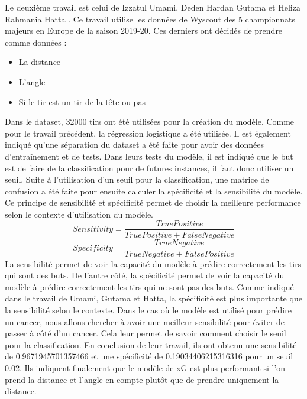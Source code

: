 \documentclass[12pt]{article}
\begin{document}
\noindent Le deuxième travail est celui de Izzatul Umami, Deden Hardan Gutama et Heliza Rahmania Hatta \cite{umamiImplementingExpectedGoal2021}. 
Ce travail utilise les données de Wyscout des 5 championnats majeurs en Europe de la saison 2019-20. Ces derniers ont décidés de prendre comme données :
\begin{itemize}
    \item La distance
    \item L'angle
    \item Si le tir est un tir de la tête ou pas
\end{itemize}
Dans le dataset, 32000 tirs ont été utilisées pour la création du modèle.
Comme pour le travail précédent, la régression logistique a été utilisée.
Il est également indiqué qu'une séparation du dataset a été faite pour avoir des données d'entraînement et de tests.
Dans leurs tests du modèle, il est indiqué que le but est de faire de la classification pour de futures instances, il faut donc utiliser un seuil.
Suite à l'utilisation d'un seuil pour la classification, une matrice de confusion a été faite pour ensuite calculer la spécificité et la sensibilité du modèle.
Ce principe de sensibilité et spécificité permet de choisir la meilleure performance selon le contexte d'utilisation du modèle.
\begin{equation}
    Sensitivity = \frac{True Positive}{True Positive + False Negative}
\end{equation}
\begin{equation}
    Specificity = \frac{True Negative}{True Negative + False Positive}
\end{equation}
La sensibilité permet de voir la capacité du modèle à prédire correctement les tirs qui sont des buts.
De l'autre côté, la spécificité permet de voir la capacité du modèle à prédire correctement les tirs qui ne sont pas des buts.
Comme indiqué dans le travail de Umami, Gutama et Hatta, la spécificité est plus importante que la sensibilité selon le contexte.
Dans le cas où le modèle est utilisé pour prédire un cancer, nous allons chercher à avoir une meilleur sensibilité pour éviter de passer à côté d'un cancer. \cite{umamiImplementingExpectedGoal2021}
Cela leur permet de savoir comment choisir le seuil pour la classification.
En conclusion de leur travail, ils ont obtenu une sensibilité de 0.9671945701357466 et une spécificité de 0.19034406215316316 pour un seuil 0.02.
Ils indiquent finalement que le modèle de xG est plus performant si l'on prend la distance et l'angle en compte plutôt que de prendre uniquement la distance.
\end{document}
